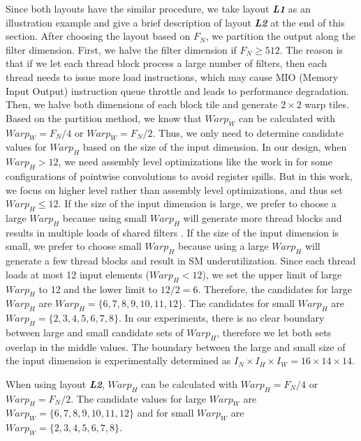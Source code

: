 Since both layouts have the similar procedure, we take layout \textbf{\emph{L1}} as an illustration example and give a brief description of layout \textbf{\emph{L2}} at the end of this section.
After choosing the layout based on $F_N$, we partition the output along the filter dimension.
First, we halve the filter dimension if $F_N \geq 512$.
The reason is that if we let each thread block process a large number of filters, then each thread needs to issue more load instructions, which may cause MIO (Memory Input Output) instruction queue throttle and leads to performance degradation.
Then, we halve both dimensions of each block tile and generate $2 \times 2$ warp tiles.
Based on the partition method, we know that $Warp_W$ can be calculated with $Warp_W=F_N/4$ or $Warp_W=F_N/2$. Thus, we only need to determine candidate values for $Warp_H$ based on the size of the input dimension.
In our design, when $Warp_H > 12$, we need assembly level optimizations like the work in
\cite{yan2020optimizing,yan2020demystifying} for some configurations of pointwise convolutions to avoid register spills. But in this work,
we focus on higher level rather than assembly level optimizations, and thus set $Warp_H \leq 12$.
If the size of the input dimension is large, we prefer to choose a large $Warp_H$ because using small $Warp_H$ will generate more thread blocks and results in multiple loads of shared filters \cite{jia2020enabling, zheng2020flextensor}.
If the size of the input dimension is small, we prefer to choose small $Warp_H$ because using a large $Warp_H$ will generate a few thread blocks and result in SM underutilization.
Since each thread loads at most 12 input elements ($Warp_H<12$), we set the upper limit of large $Warp_H$ to 12 and the lower limit to $12/2=6$.
Therefore, the candidates for large $Warp_H$ are $Warp_H=\{6,7,8,9,10,11,12\}$.
The candidates for small $Warp_H$ are $Warp_H=\{2,3,4,5,6,7,8\}$.
In our experiments, there is no clear boundary between large and small candidate sets of $Warp_H$, therefore we let both sets overlap in the middle values.
The boundary between the large and small size of the input dimension is experimentally determined as $I_N \times I_H \times I_W=16 \times 14 \times 14$.

When using layout \textbf{\emph{L2}}, $Warp_H$ can be calculated with $Warp_H=F_N/4$ or $Warp_H=F_N/2$. The candidate values for large $Warp_W$ are $Warp_W=\{6,7,8,9,10,11,12\}$ and for small $Warp_W$ are $Warp_W=\{2,3,4,5,6,7,8\}$.

